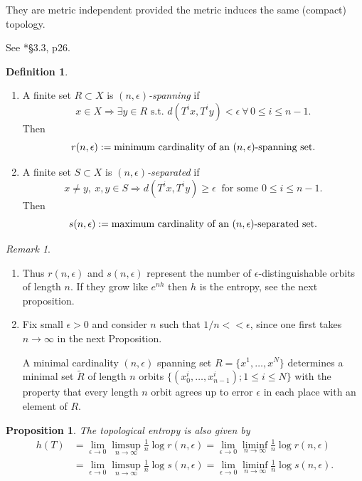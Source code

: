 \documentclass[a4paper]{amsart}
\theoremstyle{plain}
\newtheorem{proposition}[theorem]{Proposition}
\theoremstyle{definition}
\newtheorem{definition}[theorem]{Definition}%
\theoremstyle{remark}
\newtheorem{remark}[theorem]{Remark}
\begin{document}
They are metric independent provided the metric induces the same (compact) topology.

See \cite{PY}*{\S3.3, p26}.

\begin{definition}\mbox{}\label{dfted}
\begin{enumerate}

\item A finite set $ R\subset X $ is \emph{$ (n,\epsilon ) $-spanning} if 
\[
x\in X \Longrightarrow \exists y \in R \text{ s.t.\ } d(T^ix,T^iy) < \epsilon \ \forall\, 0 \leq i \leq n-1.
\]
Then 
\[
r(n,\epsilon) := \text{minimum cardinality of an $ (n,\epsilon ) $-spanning set}.
\]

\item A finite set $ S \subset X $ is \emph{$ (n,\epsilon ) $-separated} if 
\[
x\neq y, \ x,y \in S \Longrightarrow d(T^ix,T^iy) \geq  \epsilon\  \text{ for some } 0 \leq i \leq n-1.
\]
Then
\[
s(n,\epsilon) := \text{maximum cardinality of an $ (n,\epsilon ) $-separated set}.
\]
\end{enumerate} 
\end{definition} 

\begin{remark} \mbox{}
\begin{enumerate}
\item Thus $ r(n,\epsilon ) $ and $ s(n, \epsilon ) $ represent the number of $ \epsilon $-distinguishable orbits of length $ n $.  If they grow like  $ e^{nh} $ then $ h $ is the entropy, see the next proposition.
\item  Fix small $ \epsilon > 0 $ and consider $ n $ such that  $ 1/n << \epsilon $, since one first takes $ n \to \infty $ in the next Proposition.

 A minimal cardinality $ (n,\epsilon ) $ spanning set $ R = \{x^1,\dots, x^N\} $ determines a minimal set  $ \widetilde{R} $ of length $ n $ orbits $ \{(x^i_0,\dots, x^i_{n-1}); 1 \leq i \leq N \}$ with the property that every length $ n $  orbit agrees up to error $ \epsilon$ in each place   with an element of $ R $.
 \end{enumerate} 
\end{remark}

\begin{proposition} \label{eqtop} The topological entropy is also given by
\begin{align*} 
h(T) &=  \lim_{\epsilon\to 0} \limsup_{n\to \infty} \frac{1}{n} \log r(n,\epsilon) 
         = \lim_{\epsilon\to 0} \liminf_{n\to \infty} \frac{1}{n} \log r(n,\epsilon) \\
        & =  \lim_{\epsilon\to 0} \limsup_{n\to \infty} \frac{1}{n} \log s(n,\epsilon) 
          =  \lim_{\epsilon\to 0} \liminf_{n\to \infty} \frac{1}{n} \log s(n,\epsilon).
\end{align*} 
\end{proposition} 
\end{document}

